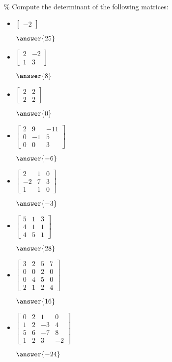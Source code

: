\documentclass{ximera}
\begin{document}
\begin{exercise}\%
    Compute the determinant of the following matrices:
    \begin{itemize}
        \item
        $\begin{bmatrix}
            -2
        \end{bmatrix}$

        $\answer{25}$
        \item
        $\begin{bmatrix}
            2 & -2 \\
            1 & 3
        \end{bmatrix}$

        $\answer{8}$
        \item
        $\begin{bmatrix}
            2 & 2 \\
            2 & 2
        \end{bmatrix}$

        $\answer{0}$
        \item
        $\begin{bmatrix}
            2 & 9 & -11 \\
            0 & -1 & 5 \\
            0 & 0 & 3
        \end{bmatrix}$

        $\answer{-6}$
        \item
        $\begin{bmatrix}
            2 & 1 & 0 \\
            -2 & 7 & 3 \\
            1 & 1 & 0
        \end{bmatrix}$

        $\answer{-3}$
        \item
        $\begin{bmatrix}
            5 & 1 & 3 \\
            4 & 1 & 1 \\
            4 & 5 & 1
        \end{bmatrix}$

        $\answer{28}$
        \item
        $\begin{bmatrix}
            3 & 2 & 5 & 7 \\
            0 & 0 & 2 & 0 \\
            0 & 4 & 5 & 0 \\
            2 & 1 & 2 & 4
        \end{bmatrix}$

        $\answer{16}$
        \item
        $\begin{bmatrix}
             0 &  2 &  1 &  0 \\
             1 &  2 & -3 &  4 \\
             5 &  6 & -7 &  8 \\
             1 &  2 &  3 & -2
        \end{bmatrix}$

        $\answer{-24}$
    \end{itemize}
\end{exercise}
\end{document}
